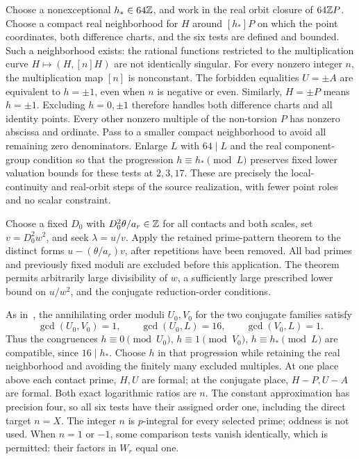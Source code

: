 \documentclass[11pt,a4paper]{article}
\begin{document}
Choose a nonexceptional $h_*\in64\mathbb Z$, and work in the real
orbit closure of $64\mathbb Z P$. Choose a compact real neighborhood
for $H$ around $[h_*]P$ on which the point coordinates, both difference charts,
and the six tests are defined and bounded. Such a neighborhood
exists: the rational functions restricted to the multiplication
curve $H\mapsto(H,[n]H)$ are not identically singular.
For every nonzero integer $n$, the multiplication map $[n]$ is
nonconstant. The forbidden equalities $U=\pm A$ are equivalent
to $h=\pm1$, even when $n$ is negative or even. Similarly,
$H=\pm P$ means $h=\pm1$. Excluding $h=0,\pm1$ therefore
handles both difference charts and all identity points. Every
other nonzero multiple of the non-torsion $P$ has nonzero
abscissa and ordinate.
Pass to a smaller compact neighborhood to avoid all remaining
zero denominators. Enlarge $L$ with $64\mid L$ and the real
component-group condition so that the progression
$h\equiv h_*\pmod L$
preserves fixed lower valuation bounds for these tests at
$2,3,17$. These are precisely the local-continuity and real-orbit
steps of the source realization, with fewer point roles and no
scalar constraint.

Choose a fixed $D_0$ with $D_0^2\theta/a_r\in\mathbb Z$ for all
contacts and both scales, set $v=D_0^2w^2$, and seek
$\lambda=u/v$. Apply the retained prime-pattern theorem to
the distinct forms $u-(\theta/a_r)v$, after repetitions have
been removed. All bad primes and previously fixed moduli are
excluded before this application. The theorem permits arbitrarily
large divisibility of $w$, a sufficiently large prescribed lower
bound on $u/w^2$, and the conjugate reduction-order conditions.

As in~\cite{Dependencies,Baseline}, the annihilating order moduli
$U_0,V_0$ for the two conjugate families satisfy
\[
 \gcd(U_0,V_0)=1,\qquad \gcd(U_0,L)=16,\qquad\gcd(V_0,L)=1.
\]
Thus the congruences
$h\equiv0\pmod{U_0}$, $h\equiv1\pmod{V_0}$,
$h\equiv h_*\pmod L$ are compatible, since $16\mid h_*$.
Choose $h$ in that
progression while retaining the real neighborhood and avoiding
the finitely many excluded multiples. At one place above each
contact prime, $H,U$ are formal; at the conjugate place,
$H-P,U-A$ are formal. Both exact logarithmic ratios are $n$.
The constant approximation has precision four, so all six tests
have their assigned order one, including the direct target $n=X$. The integer $n$ is $p$-integral
for every selected prime; oddness is not used. When $n=1$ or $-1$,
some comparison tests vanish identically, which is permitted: their
factors in $W_r$ equal one.
\end{document}
